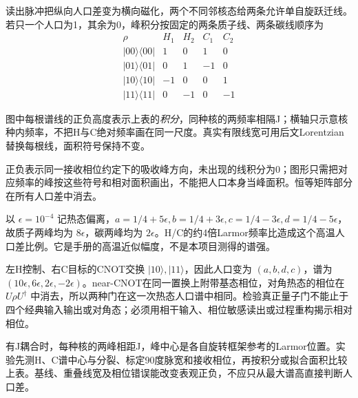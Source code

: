 \begin{solution}
读出脉冲把纵向人口差变为横向磁化，两个不同邻核态给两条允许单自旋跃迁线。若只一个人口为1，其余为0，峰积分按固定的两条质子线、两条碳线顺序为
\[
\begin{array}{c|rrrr}
\rho&H_1&H_2&C_1&C_2\\\hline
|00\rangle\langle00|&1&0&1&0\\
|01\rangle\langle01|&0&1&-1&0\\
|10\rangle\langle10|&-1&0&0&1\\
|11\rangle\langle11|&0&-1&0&-1
\end{array}
\]
\begin{center}
\end{center}
图中每根谱线的正负高度表示上表的\emph{积分}，同种核的两频率相隔J；横轴只示意核种内频率，不把H与C绝对频率画在同一尺度。真实有限线宽可用后文Lorentzian替换每根线，面积符号保持不变。

正负表示同一接收相位约定下的吸收峰方向，未出现的线积分为0；图形只需把对应频率的峰按这些符号和相对面积画出，不能把人口本身当峰面积。恒等矩阵部分在所有人口差中消去。

以 $\epsilon=10^{-4}$ 记热态偏离，$a=1/4+5\epsilon,b=1/4+3\epsilon,c=1/4-3\epsilon,d=1/4-5\epsilon$，故质子两峰均为 $8\epsilon$，碳两峰均为 $2\epsilon$。H/C的约4倍Larmor频率比造成这个高温人口差比例。它是手册的高温近似幅度，不是本项目测得的谱强。

左H控制、右C目标的CNOT交换 $|10\rangle,|11\rangle$，因此人口变为 $(a,b,d,c)$，谱为 $(10\epsilon,6\epsilon,2\epsilon,-2\epsilon)$。near-CNOT在同一置换上附带基态相位，对角热态的相位在 $U\rho U^\dagger$ 中消去，所以两种门在这一次热态人口谱中相同。检验真正量子门不能止于四个经典输入输出或对角态；必须用相干输入、相位敏感读出或过程重构揭示相对相位。

有J耦合时，每种核的两峰相距J，峰中心是各自旋转框架参考的Larmor位置。实验先测H、C谱中心与分裂、标定90度脉宽和接收相位，再按积分或拟合面积比较上表。基线、重叠线宽及相位错误能改变表观正负，不应只从最大谱高直接判断人口差。
\end{solution}

